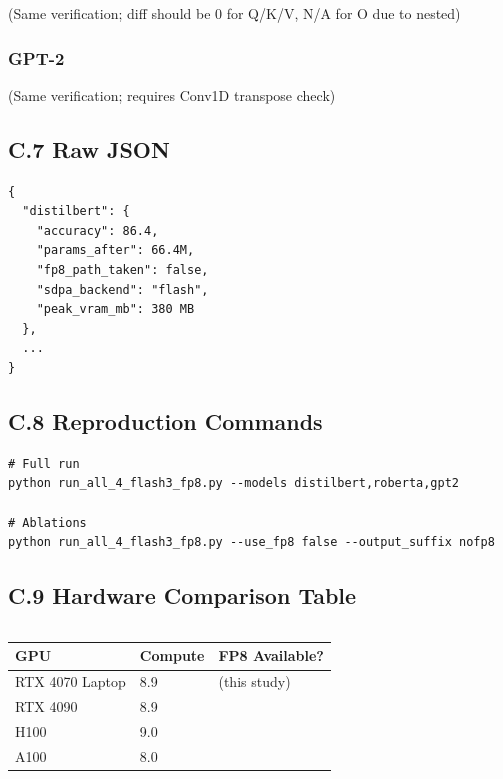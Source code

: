 (Same verification; diff should be 0 for Q/K/V, N/A for O due to nested)

\subsubsection{GPT-2}

(Same verification; requires Conv1D transpose check)

\subsection{C.7 Raw JSON}

\begin{lstlisting}
{
  "distilbert": {
    "accuracy": 86.4,
    "params_after": 66.4M,
    "fp8_path_taken": false,
    "sdpa_backend": "flash",
    "peak_vram_mb": 380 MB
  },
  ...
}
\end{lstlisting}

\subsection{C.8 Reproduction Commands}

\begin{lstlisting}
# Full run
python run_all_4_flash3_fp8.py --models distilbert,roberta,gpt2

# Ablations
python run_all_4_flash3_fp8.py --use_fp8 false --output_suffix nofp8
\end{lstlisting}

\subsection{C.9 Hardware Comparison Table}

\begin{lstlisting}
\end{lstlisting}
\begin{table}[H]
\centering
\small
\begin{tabular}{lll}
\toprule
\textbf{GPU} & \textbf{Compute} & \textbf{FP8 Available?} \\
\midrule
RTX 4070 Laptop & 8.9 & (this study) \\
RTX 4090 & 8.9 &  \\
H100 & 9.0 &  \\
A100 & 8.0 &  \\
\bottomrule
\end{tabular}
\end{table}

